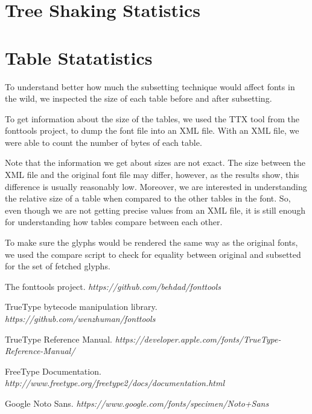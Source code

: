 \documentclass[12pt]{article}
\begin{document}
\clearpage
\begin{appendices}
\section{Tree Shaking Statistics}



\section{Table Statatistics}

To understand better how much the subsetting technique would affect
fonts in the wild, we inspected the size of each table before and after
subsetting.

To get information about the size of the tables, we used the TTX tool
from the fonttools project, to dump the font file into an XML file. With
an XML file, we were able to count the number of bytes of each table.

Note that the information we get about sizes are not exact. The size
between the XML file and the original font file may differ, however, as the
results show, this difference is usually reasonably low. Moreover, we
are interested in understanding the relative size of a table when
compared to the other tables in the font. So, even though we are not
getting precise values from an XML file, it is still enough for
understanding how tables compare between each other.

To make sure the glyphs would be rendered the same way as the original
fonts, we used the compare script to check for equality between original
and subsetted for the set of fetched glyphs. 



\end{appendices}

\clearpage
\begin{thebibliography}{1}

 The fonttools project. {\em https://github.com/behdad/fonttools } 

 TrueType bytecode manipulation library. 
{\em https://github.com/wenzhuman/fonttools } 

 TrueType Reference Manual. 
{\em https://developer.apple.com/fonts/TrueType-Reference-Manual/ } 

 FreeType Documentation.
{\em http://www.freetype.org/freetype2/docs/documentation.html }

 Google Noto Sans. 
{\em https://www.google.com/fonts/specimen/Noto+Sans } 

\end{thebibliography}
\end{document}
